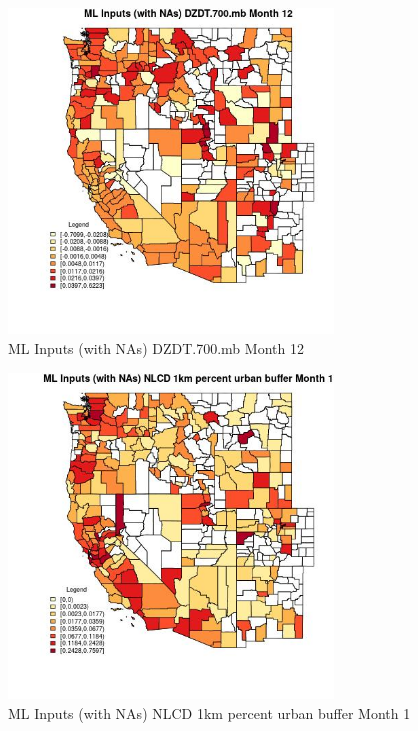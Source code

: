 \begin{figure} 
\centering  
\includegraphics[width=0.77\textwidth]{Code_Outputs/Report_ML_input_PM25_Step4_part_f_de_duplicated_aves_prioritize_24hr_obswNAs_CountyDZDT700mbmedianMonth12.jpg} 
\caption{\label{fig:Report_ML_input_PM25_Step4_part_f_de_duplicated_aves_prioritize_24hr_obswNAsCountyDZDT700mbmedianMonth12}ML Inputs (with NAs) DZDT.700.mb Month 12} 
\end{figure} 
 

\clearpage 

\begin{figure} 
\centering  
\includegraphics[width=0.77\textwidth]{Code_Outputs/Report_ML_input_PM25_Step4_part_f_de_duplicated_aves_prioritize_24hr_obswNAs_CountyNLCD_1km_percent_urban_buffermedianMonth1.jpg} 
\caption{\label{fig:Report_ML_input_PM25_Step4_part_f_de_duplicated_aves_prioritize_24hr_obswNAsCountyNLCD_1km_percent_urban_buffermedianMonth1}ML Inputs (with NAs) NLCD 1km percent urban buffer Month 1} 
\end{figure} 
 

